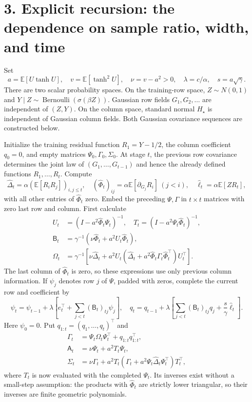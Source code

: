 \documentclass[
  11pt,
  a4paper,
]{article}
\begin{document}
\hypertarget{explicit-recursion-the-dependence-on-sample-ratio-width-and-time}{%
\section{3. Explicit recursion: the dependence on sample ratio, width,
and
time}\label{explicit-recursion-the-dependence-on-sample-ratio-width-and-time}}

Set \[
a=\mathbb E[U\tanh U],\quad v=\mathbb E[\tanh^2U],\quad
\nu=v-a^2>0,\quad \lambda=c/\alpha,\quad s=a\sqrt\gamma.
\] There are two scalar probability spaces. On the training-row space,
\(Z\sim N(0,1)\) and
\(Y\mid Z\sim\operatorname{Bernoulli}(\sigma(\beta Z))\). Gaussian row
fields \(G_1,G_2,\ldots\) are independent of \((Z,Y)\). On the column
space, standard normal \(H_\star\) is independent of Gaussian column
fields. Both Gaussian covariance sequences are constructed below.

Initialize the training residual function \(R_1=Y-1/2\), the column
coefficient \(q_0=0\), and empty matrices \(\Psi_0,\Gamma_0,\Sigma_0\).
At stage \(t\), the previous row covariance determines the joint law of
\((G_1,\ldots,G_{t-1})\) and hence the already defined functions
\(R_1,\ldots,R_t\). Compute \[
\widehat\Delta_t=\alpha(\mathbb E[R_iR_j])_{i,j\le t},\quad
(\widehat\Phi_t)_{ij}=\alpha\mathbb E[\partial_{G_j}R_i]\ (j<i),\quad
\widehat\ell_t=\alpha\mathbb E[ZR_t], \tag{7}
\] with all other entries of \(\widehat\Phi_t\) zero. Embed the
preceding \(\Psi,\Gamma\) in \(t\times t\) matrices with zero last row
and column. First calculate \[
\begin{aligned}
U_t&=(I-a^2\widehat\Phi_t\Psi_t)^{-1},\quad T_t=(I-a^2\Psi_t\widehat\Phi_t)^{-1},\\
\mathsf B_t&=\gamma^{-1}(\nu\widehat\Phi_t+a^2U_t\widehat\Phi_t),\\
\Omega_t&=\gamma^{-1}\left[\nu\widehat\Delta_t+
a^2U_t(\widehat\Delta_t+a^2\widehat\Phi_t\Gamma_t\widehat\Phi_t^\top)U_t^\top\right].
\end{aligned} \tag{8}
\] The last column of \(\widehat\Phi_t\) is zero, so these expressions
use only previous column information. If \(\psi_j\) denotes row \(j\) of
\(\Psi\), padded with zeros, complete the current row and coefficient by
\[
\psi_t=\psi_{t-1}+\lambda\left[e_t^\top+\sum_{j<t}(\mathsf B_t)_{tj}\psi_j\right],
\quad q_t=q_{t-1}+\lambda\left[\sum_{j<t}(\mathsf B_t)_{tj}q_j+
\frac{s}{\gamma}\widehat\ell_t\right].
\] Here \(\psi_0=0\). Put \(q_{1:t}=(q_1,\ldots,q_t)^\top\) and \[
\begin{aligned}
\Gamma_t&=\Psi_t\Omega_t\Psi_t^\top+q_{1:t}q_{1:t}^\top,\\
\mathsf A_t&=\nu\Psi_t+a^2T_t\Psi_t,\\
\Sigma_t&=\nu\Gamma_t+a^2T_t
(\Gamma_t+a^2\Psi_t\widehat\Delta_t\Psi_t^\top)T_t^\top,
\end{aligned} \tag{9}
\] where \(T_t\) is now evaluated with the completed \(\Psi_t\). Its
inverses exist without a small-step assumption: the products with
\(\widehat\Phi_t\) are strictly lower triangular, so their inverses are
finite geometric polynomials.
\end{document}
